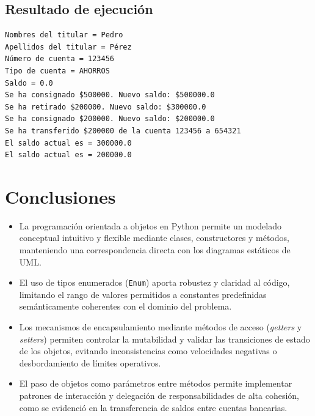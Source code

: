 \documentclass[11pt,a4paper]{article}
\begin{document}
\subsection{Resultado de ejecución}
\begin{verbatim}
Nombres del titular = Pedro
Apellidos del titular = Pérez
Número de cuenta = 123456
Tipo de cuenta = AHORROS
Saldo = 0.0
Se ha consignado $500000. Nuevo saldo: $500000.0
Se ha retirado $200000. Nuevo saldo: $300000.0
Se ha consignado $200000. Nuevo saldo: $200000.0
Se ha transferido $200000 de la cuenta 123456 a 654321
El saldo actual es = 300000.0
El saldo actual es = 200000.0
\end{verbatim}

\newpage

\section{Conclusiones}
\begin{itemize}[leftmargin=*]
    \item La programación orientada a objetos en Python permite un modelado conceptual intuitivo y flexible mediante clases, constructores y métodos, manteniendo una correspondencia directa con los diagramas estáticos de UML.
    \item El uso de tipos enumerados (\texttt{Enum}) aporta robustez y claridad al código, limitando el rango de valores permitidos a constantes predefinidas semánticamente coherentes con el dominio del problema.
    \item Los mecanismos de encapsulamiento mediante métodos de acceso (\textit{getters} y \textit{setters}) permiten controlar la mutabilidad y validar las transiciones de estado de los objetos, evitando inconsistencias como velocidades negativas o desbordamiento de límites operativos.
    \item El paso de objetos como parámetros entre métodos permite implementar patrones de interacción y delegación de responsabilidades de alta cohesión, como se evidenció en la transferencia de saldos entre cuentas bancarias.
\end{itemize}
\end{document}
